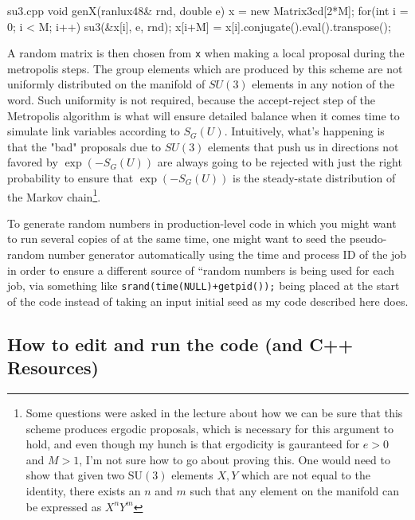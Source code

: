\documentclass[11pt]{article}
\begin{document}
\begin{center}
\begin{minipage}{0.85\linewidth}
\begin{code}{su3.cpp}
void genX(ranlux48& rnd, double e)
{
        x = new Matrix3cd[2*M];
        for(int i = 0; i < M; i++){
                su3(&x[i], e, rnd);
                x[i+M] = x[i].conjugate().eval().transpose();
        }
}
\end{code}
\end{minipage}
\end{center}

A random matrix is then chosen from \lstinline{x} when making a local proposal during the metropolis steps. The group elements which are produced by this scheme are not uniformly distributed on the manifold of $SU(3)$ elements in any notion of the word. Such uniformity is not required, because the accept-reject step of the Metropolis algorithm is what will ensure detailed balance when it comes time to simulate link variables according to $S_G(U)$. Intuitively, what's happening is that the "bad" proposals due to $SU(3)$ elements that push us in directions not favored by $\exp(-S_G(U))$ are always going to be rejected with just the right probability to ensure that $\exp(-S_G(U))$ is the steady-state distribution of the Markov chain\footnote{Some questions were asked in the lecture about how we can be sure that this scheme produces ergodic proposals, which is necessary for this argument to hold, and even though my hunch is that ergodicity is gauranteed for $e>0$ and $M>1$, I'm not sure how to go about proving this. One would need to show that given two $\mathrm{SU}(3)$ elements $X,Y$ which are not equal to the identity, there exists an $n$ and $m$ such that any element on the manifold can be expressed as $X^nY^m$}.

To generate random numbers in production-level code in which you might want to run several copies of at the same time, one might want to seed the pseudo-random number generator automatically using the time and process ID of the job in order to ensure a different source of ``random numbers is being used for each job, via something like \lstinline{srand(time(NULL)+getpid());} being placed at the start of the code instead of taking an input initial seed as my code described here does. 

\subsection{How to edit and run the code (and C++ Resources)}
\end{document}
